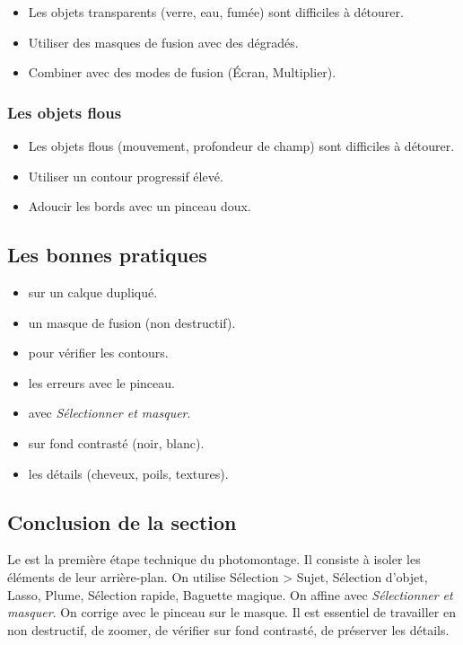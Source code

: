 \begin{itemize}
    \item Les objets transparents (verre, eau, fumée) sont difficiles à détourer.
    \item Utiliser des masques de fusion avec des dégradés.
    \item Combiner avec des modes de fusion (Écran, Multiplier).
\end{itemize}

\subsubsection{Les objets flous}

\begin{itemize}
    \item Les objets flous (mouvement, profondeur de champ) sont difficiles à détourer.
    \item Utiliser un contour progressif élevé.
    \item Adoucir les bords avec un pinceau doux.
\end{itemize}

\subsection{Les bonnes pratiques}

\begin{itemize}
    \item {} sur un calque dupliqué.
    \item {} un masque de fusion (non destructif).
    \item {} pour vérifier les contours.
    \item {} les erreurs avec le pinceau.
    \item {} avec \emph{Sélectionner et masquer}.
    \item {} sur fond contrasté (noir, blanc).
    \item {} les détails (cheveux, poils, textures).
\end{itemize}

\subsection*{Conclusion de la section}

Le  est la première étape technique du photomontage. Il consiste à isoler les éléments de leur arrière-plan. On utilise Sélection > Sujet, Sélection d'objet, Lasso, Plume, Sélection rapide, Baguette magique. On affine avec \emph{Sélectionner et masquer}. On corrige avec le pinceau sur le masque. Il est essentiel de travailler en non destructif, de zoomer, de vérifier sur fond contrasté, de préserver les détails.

